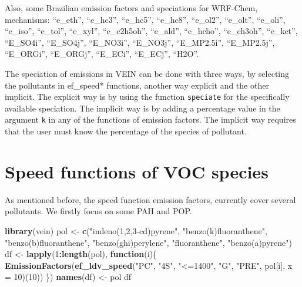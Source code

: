 \documentclass[12pt,graybox,envcountchap,sectrefs]{krantz}
\makeatletter
\newenvironment{Shaded}{\begin{snugshade}}{\end{snugshade}}
\newcommand{\KeywordTok}[1]{\textcolor[rgb]{0.13,0.29,0.53}{\textbf{#1}}}
\newcommand{\DataTypeTok}[1]{\textcolor[rgb]{0.13,0.29,0.53}{#1}}
\newcommand{\DecValTok}[1]{\textcolor[rgb]{0.00,0.00,0.81}{#1}}
\newcommand{\StringTok}[1]{\textcolor[rgb]{0.31,0.60,0.02}{#1}}
\newcommand{\ControlFlowTok}[1]{\textcolor[rgb]{0.13,0.29,0.53}{\textbf{#1}}}
\newcommand{\OperatorTok}[1]{\textcolor[rgb]{0.81,0.36,0.00}{\textbf{#1}}}
\newcommand{\NormalTok}[1]{#1}
\newenvironment{kframe}{%
\medskip{}
\setlength{\fboxsep}{.8em}
 \def\at@end@of@kframe{}%
 \ifinner\ifhmode%
  \def\at@end@of@kframe{\end{minipage}}%
  \begin{minipage}{\columnwidth}%
 \fi\fi%
 \def\FrameCommand##1{\hskip\@totalleftmargin \hskip-\fboxsep
 \colorbox{shadecolor}{##1}\hskip-\fboxsep
     \hskip-\linewidth \hskip-\@totalleftmargin \hskip\columnwidth}%
 \MakeFramed {\advance\hsize-\width
   \@totalleftmargin\z@ \linewidth\hsize
   \@setminipage}}%
 {\par\unskip\endMakeFramed%
 \at@end@of@kframe}
\renewenvironment{Shaded}{\begin{kframe}}{\end{kframe}}
\theoremstyle{definition}
\theoremstyle{definition}
\theoremstyle{definition}
\theoremstyle{remark}
\makeatother
\begin{document}
Also, some Brazilian emission factors and speciations for WRF-Chem,
mechanisms: ``e\_eth'', ``e\_hc3'', ``e\_hc5'', ``e\_hc8'', ``e\_ol2'',
``e\_olt'', ``e\_oli'', ``e\_iso'', ``e\_tol'', ``e\_xyl'',
``e\_c2h5oh'', ``e\_ald'', ``e\_hcho'', ``e\_ch3oh'', ``e\_ket'',
``E\_SO4i'', ``E\_SO4j'', ``E\_NO3i'', ``E\_NO3j'', ``E\_MP2.5i'',
``E\_MP2.5j'', ``E\_ORGi'', ``E\_ORGj'', ``E\_ECi'', ``E\_ECj'',
``H2O''.

The speciation of emissions in VEIN can be done with three ways, by
selecting the pollutants in ef\_speed* functions, another way explicit
and the other implicit. The explicit way is by using the function
\texttt{speciate} for the specifically available speciation. The
implicit way is by adding a percentage value in the argument \texttt{k}
in any of the functions of emission factors. The implicit way requires
that the user must know the percentage of the species of pollutant.

\section{Speed functions of VOC
species}\label{speed-functions-of-voc-species}

As mentioned before, the speed function emission factors, currently
cover several pollutants. We firstly focus on some PAH and POP.

\begin{Shaded}
\begin{Highlighting}[]
\KeywordTok{library}\NormalTok{(vein)}
\NormalTok{pol <-}\StringTok{ }\KeywordTok{c}\NormalTok{(}\StringTok{"indeno(1,2,3-cd)pyrene"}\NormalTok{, }\StringTok{"benzo(k)fluoranthene"}\NormalTok{,}
         \StringTok{"benzo(b)fluoranthene"}\NormalTok{, }\StringTok{"benzo(ghi)perylene"}\NormalTok{, }\StringTok{"fluoranthene"}\NormalTok{,}
         \StringTok{"benzo(a)pyrene"}\NormalTok{)}
\NormalTok{df <-}\StringTok{ }\KeywordTok{lapply}\NormalTok{(}\DecValTok{1}\OperatorTok{:}\KeywordTok{length}\NormalTok{(pol), }\ControlFlowTok{function}\NormalTok{(i)\{}
  \KeywordTok{EmissionFactors}\NormalTok{(}\KeywordTok{ef_ldv_speed}\NormalTok{(}\StringTok{"PC"}\NormalTok{, }\StringTok{"4S"}\NormalTok{, }\StringTok{"<=1400"}\NormalTok{, }\StringTok{"G"}\NormalTok{, }\StringTok{"PRE"}\NormalTok{,}
\NormalTok{                               pol[i], }\DataTypeTok{x =} \DecValTok{10}\NormalTok{)(}\DecValTok{10}\NormalTok{))}
\NormalTok{\})}
\KeywordTok{names}\NormalTok{(df) <-}\StringTok{ }\NormalTok{pol}
\NormalTok{df}
\end{Highlighting}
\end{Shaded}
\end{document}
